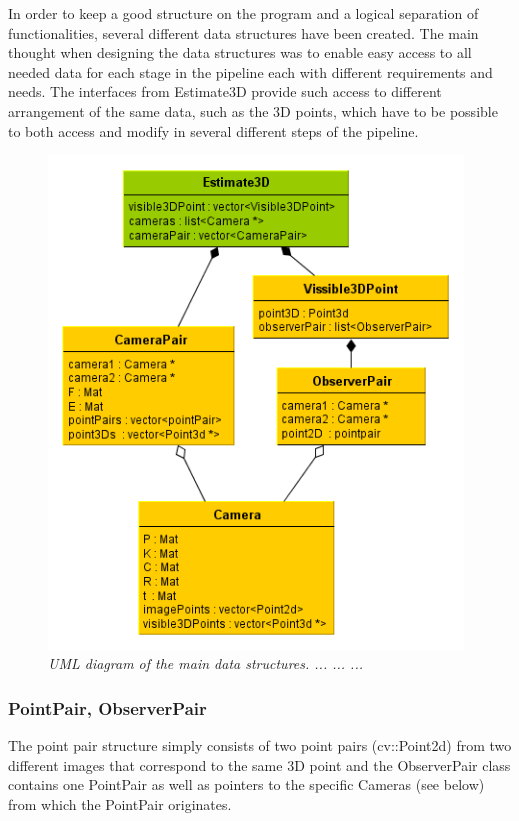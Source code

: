 In order to keep a good structure on the program and a logical separation of functionalities, several different data structures have been created. The main thought when designing the data structures was to enable easy access to all needed data for each stage in the pipeline each with different requirements and needs. The interfaces from Estimate3D provide such access to different arrangement of the same data, such as the 3D points, which have to be possible to both access and modify in several different steps of the pipeline.

\begin{figure}[htb]
	\centering
	\includegraphics[width=110mm]{images/data_structures_uml.png}
	\caption{\textit{UML diagram of the main data structures. ... ... ...}}
	\label{fig:UML_fig} %
\end{figure}

\subsubsection{PointPair, ObserverPair}
The point pair structure simply consists of two point pairs (cv::Point2d) from two different images that correspond to the same 3D point and the ObserverPair class contains one PointPair as well as pointers to the specific Cameras (see below) from which the PointPair originates. 

